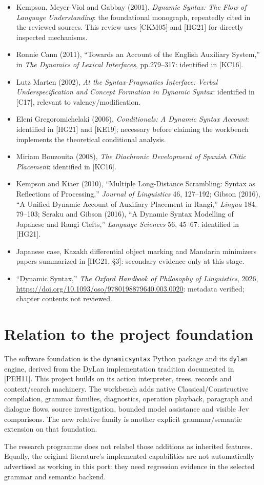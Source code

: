 \documentclass[11pt,a4paper]{article}
\providecommand{\tightlist}{\setlength{\itemsep}{2pt}\setlength{\parskip}{0pt}}
\begin{document}
\begin{itemize}
\tightlist
\item
  Kempson, Meyer-Viol and Gabbay (2001), \emph{Dynamic Syntax: The Flow
  of Language Understanding}: the foundational monograph, repeatedly
  cited in the reviewed sources. This review uses {[}CKM05{]} and
  {[}HG21{]} for directly inspected mechanisms.
\item
  Ronnie Cann (2011), ``Towards an Account of the English Auxiliary
  System,'' in \emph{The Dynamics of Lexical Interfaces}, pp.279--317:
  identified in {[}KC16{]}.
\item
  Lutz Marten (2002), \emph{At the Syntax-Pragmatics Interface: Verbal
  Underspecification and Concept Formation in Dynamic Syntax}:
  identified in {[}C17{]}, relevant to valency/modification.
\item
  Eleni Gregoromichelaki (2006), \emph{Conditionals: A Dynamic Syntax
  Account}: identified in {[}HG21{]} and {[}KE19{]}; necessary before
  claiming the workbench implements the theoretical conditional
  analysis.
\item
  Miriam Bouzouita (2008), \emph{The Diachronic Development of Spanish
  Clitic Placement}: identified in {[}KC16{]}.
\item
  Kempson and Kiaer (2010), ``Multiple Long-Distance Scrambling: Syntax
  as Reflections of Processing,'' \emph{Journal of Linguistics} 46,
  127--192; Gibson (2016), ``A Unified Dynamic Account of Auxiliary
  Placement in Rangi,'' \emph{Lingua} 184, 79--103; Seraku and Gibson
  (2016), ``A Dynamic Syntax Modelling of Japanese and Rangi Clefts,''
  \emph{Language Sciences} 56, 45--67: identified in {[}HG21{]}.
\item
  Japanese case, Kazakh differential object marking and Mandarin
  minimizers papers summarized in {[}HG21, §3{]}: secondary evidence
  only at this stage.
\item
  ``Dynamic Syntax,'' \emph{The Oxford Handbook of Philosophy of
  Linguistics}, 2026,
  \url{https://doi.org/10.1093/oso/9780198879640.003.0020}: metadata
  verified; chapter contents not reviewed.
\end{itemize}

\section{Relation to the project
foundation}\label{relation-to-the-project-foundation}

The software foundation is the \texttt{dynamicsyntax} Python package and
its \texttt{dylan} engine, derived from the DyLan implementation
tradition documented in {[}PEH11{]}. This project builds on its action
interpreter, trees, records and context/search machinery. The workbench
adds native Classical/Constructive compilation, grammar families,
diagnostics, operation playback, paragraph and dialogue flows, source
investigation, bounded model assistance and visible Jev comparisons. The
new relative family is another explicit grammar/semantic extension on
that foundation.

The research programme does not relabel those additions as inherited
features. Equally, the original literature's implemented capabilities
are not automatically advertised as working in this port: they need
regression evidence in the selected grammar and semantic backend.
\end{document}

